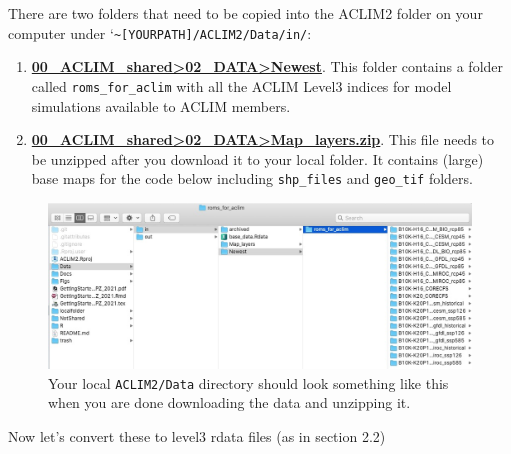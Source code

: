 \documentclass[
]{article}
\begin{document}
There are two folders that need to be copied into the ACLIM2 folder on
your computer under
`\texttt{\textasciitilde{}{[}YOURPATH{]}/ACLIM2/Data/in/}:

\begin{enumerate}
\def\labelenumi{\arabic{enumi})}
\item
  \href{https://drive.google.com/drive/u/0/folders/0Bx7wdZllbuF9eDJndkhCS2EwQUk}{\textbf{00\_ACLIM\_shared\textgreater02\_DATA\textgreater Newest}}.
  This folder contains a folder called \texttt{roms\_for\_aclim} with
  all the ACLIM Level3 indices for model simulations available to ACLIM
  members.
\item
  \href{https://drive.google.com/drive/u/0/folders/0Bx7wdZllbuF9eDJndkhCS2EwQUk}{\textbf{00\_ACLIM\_shared\textgreater02\_DATA\textgreater Map\_layers.zip}}.
  This file needs to be unzipped after you download it to your local
  folder. It contains (large) base maps for the code below including
  \texttt{shp\_files} and \texttt{geo\_tif} folders.
\end{enumerate}

\begin{figure}
\centering
\includegraphics[width=1\textwidth,height=\textheight]{Figs/data_dir.jpg}
\caption{Your local \texttt{ACLIM2/Data} directory should look something
like this when you are done downloading the data and unzipping it.}
\end{figure}

Now let's convert these to level3 rdata files (as in section 2.2)
\end{document}
